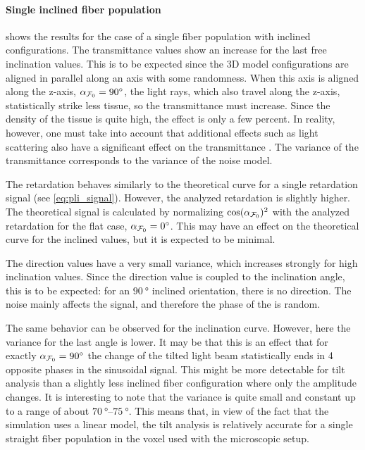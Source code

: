 \paragraph{Single inclined fiber population}
 shows the results for the case of a single fiber population with inclined configurations.
The transmittance values show an increase for the last free inclination values.
This is to be expected since the 3D model configurations are aligned in parallel along an axis with some randomness.
When this axis is aligned along the z-axis, \ie{} $\textnormal{$\alpha_{\textnormal{$\mathcal{F}_0$}}$}=\SI{90}{\degree}$, the light rays, which also travel along the z-axis, statistically strike less tissue, so the transmittance must increase.
Since the density of the tissue is quite high, the effect is only a few percent.
In reality, however, one must take into account that additional effects such as light scattering also have a significant effect on the transmittance \cite{Menzel2021}.
The variance of the transmittance corresponds to the variance of the noise model.
\par
%
The retardation behaves similarly to the theoretical curve for a single retardation signal (see \cref{eq:pli_signal}).
However, the analyzed retardation is slightly higher.
The theoretical signal is calculated by normalizing $\cos(\textnormal{$\alpha_{\textnormal{$\mathcal{F}_0$}}$})^2$ with the analyzed retardation for the flat case, \ie{} $\textnormal{$\alpha_{\textnormal{$\mathcal{F}_0$}}$} = \SI{0}{\degree}$.
This may have an effect on the theoretical curve for the inclined values, but it is expected to be minimal.
\par
%
The direction values have a very small variance, which increases strongly for high inclination values.
Since the direction value is coupled to the inclination angle, this is to be expected: for an $\SI{90}{\degree}$ inclined orientation, there is no direction.
The noise mainly affects the signal, and therefore the phase of the  is random.
\par
%
The same behavior can be observed for the inclination curve.
However, here the variance for the last angle is lower.
It may be that this is an effect that for exactly $\textnormal{$\alpha_{\textnormal{$\mathcal{F}_0$}}$}=\SI{90}{\degree}$ the change of the tilted light beam statistically ends in 4 opposite phases in the sinusoidal signal.
This might be more detectable for tilt analysis than a slightly less inclined fiber configuration where only the amplitude changes.
It is interesting to note that the variance is quite small and constant up to a range of about $\SIrange{70}{75}{\degree}$.
This means that, in view of the fact that the simulation uses a linear model, the tilt analysis is relatively accurate for a single straight fiber population in the voxel used with the microscopic setup.
